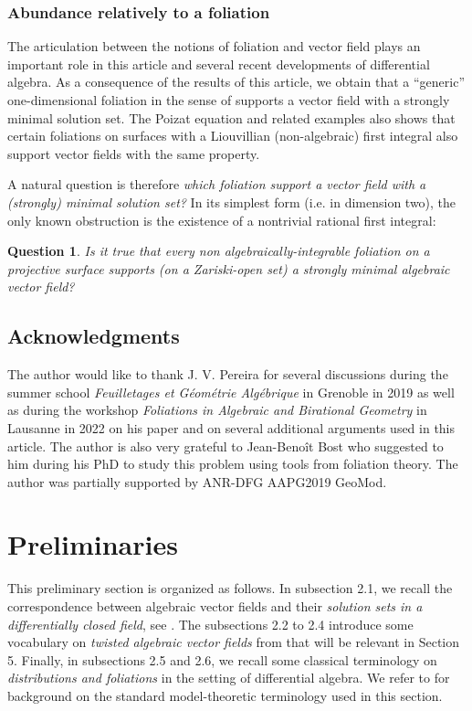 \documentclass[12pt]{amsart}
\theoremstyle{definition}
\theoremstyle{plain}
\newtheorem{question}[definition]{Question}
\theoremstyle{exampstyle}
\theoremstyle{exampstyle}\newtheorem{thmxbis}{Theorem}
\numberwithin{equation}{section}
\theoremstyle{remark}
\begin{document}
\subsubsection*{Abundance relatively to a foliation} The articulation between the notions of foliation and vector field plays an important role in this article and several recent developments of differential algebra.  As a consequence of the results of this article, we obtain that a ``generic'' one-dimensional foliation in the sense of \cite{Coutinho-Pereira} supports a vector field with a strongly minimal solution set. The Poizat equation and related examples also shows that certain foliations on surfaces with a Liouvillian (non-algebraic) first integral also support vector fields with the same property. 

A natural question is therefore \textit{which foliation support a vector field with a (strongly) minimal solution set?} In its simplest form (i.e. in dimension two), the only known obstruction is the existence of a nontrivial rational first integral:
%
\begin{question}
Is it true that every non algebraically-integrable foliation on a projective surface supports (on a Zariski-open set) a strongly minimal algebraic vector field? 
\end{question} 
%
%
%
\subsection{Acknowledgments} The author would like to thank J. V. Pereira for several discussions during the summer school \textit{Feuilletages et Géométrie Algébrique} in Grenoble in 2019 as well as during the workshop \textit{Foliations in Algebraic and Birational Geometry} in Lausanne in 2022  on his paper \cite{Pereira-JEMS} and on several additional  arguments used in this article. The author is also very grateful to Jean-Benoît Bost who suggested to him during his PhD  to study this problem using tools from foliation theory. The author was partially supported by ANR-DFG AAPG2019 GeoMod.
 

\section{Preliminaries} 

This preliminary section is organized as follows. In subsection 2.1, we recall the correspondence between  algebraic vector fields and their {\em{solution sets in a differentially closed field}}, see \cite{Hrushovski-Itai,Freitag-Jaoui-Moosa,Jaoui-Moosa}. The subsections 2.2 to 2.4 introduce some vocabulary on {\em twisted algebraic vector fields} from \cite{Coutinho-Pereira, Coutinho,Pereira-JEMS} that will be relevant in Section 5. Finally, in subsections 2.5 and 2.6, we recall some classical terminology on {\em distributions and foliations} in the setting of differential algebra. We refer to \cite[Sections 2 and 3]{Pizarro} for background on the standard model-theoretic terminology used in this section.
\end{document}
